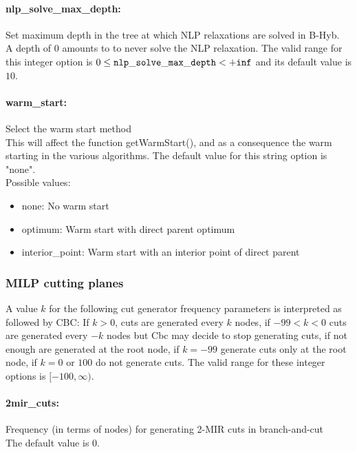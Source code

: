 \paragraph{nlp\_solve\_max\_depth:} Set maximum depth in the tree at which NLP relaxations are solved in B-Hyb. $\;$ \\
 A depth of 0 amounts to to never solve the NLP
relaxation. The valid range for this integer option is
$0 \le {\tt nlp\_solve\_max\_depth } <  {\tt +inf}$
and its default value is $10$.

\paragraph{warm\_start:} Select the warm start method $\;$ \\
 This will affect the function getWarmStart(), and
as a consequence the warm starting in the various
algorithms.
The default value for this string option is "none".
\\ 
Possible values:
\begin{itemize}
   \item none: No warm start
   \item optimum: Warm start with direct parent optimum
   \item interior\_point: Warm start with an interior point of direct
parent
\end{itemize}


\subsubsection{MILP cutting planes}
\label{sec:bonmin_options_for_MILP_cutting_planes}

A value $k$ for the following cut generator frequency parameters is interpreted as followed by CBC:
If $k > 0$, cuts are generated every $k$ nodes, if
$-99 < k < 0$ cuts are generated every $-k$ nodes but
Cbc may decide to stop generating cuts, if not
enough are generated at the root node, if $k=-99$
generate cuts only at the root node, if $k=0$ or
$100$ do not generate cuts.
The valid range for these integer options is $[-100, \infty)$.

\paragraph{2mir\_cuts:} Frequency (in terms of nodes) for generating 2-MIR cuts in branch-and-cut $\;$ \\
The default value is $0$.

